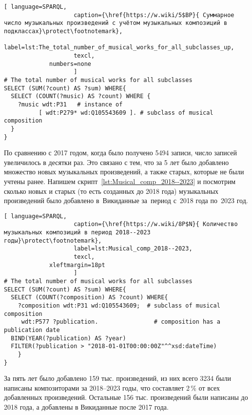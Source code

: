 \begin{lstlisting}[ language=SPARQL,
                    caption={\href{https://w.wiki/5$BP}{ Суммарное число музыкальных произведений с учётом музыкальных композиций в подклассах}\protect\footnotemark},
                    label=lst:The_total_number_of_musical_works_for_all_subclasses_up,
                    texcl,
	         numbers=none
                    ]
# The total number of musical works for all subclasses 
SELECT (SUM(?count) AS ?sum) WHERE{
  SELECT (COUNT(?music) AS ?count) WHERE {
    ?music wdt:P31   # instance of
          [ wdt:P279* wd:Q105543609 ]. # subclass of musical composition
  }
}
\end{lstlisting}%

По сравнению с 2017 годом, когда было получено \num{5494} записи, число записей увеличилось в десятки раз. Это связано с тем, что за 5 лет было добавлено множество новых музыкальных произведений, а также старых, которые не были учтены ранее.
Напишем скрипт~\ref{lst:Musical_comp_2018--2023} и посмотрим сколько новых и старых (то есть созданных до 2018 года) музыкальных произведений было добавлено в~Викиданные за~период с~2018 года по~2023 год.

\begin{lstlisting}[ language=SPARQL,
                    caption={\href{https://w.wiki/8P$N}{ Количество музыкальных композиций в период 2018--2023 годы}\protect\footnotemark},
                    label=lst:Musical_comp_2018--2023,
                    texcl,
	         xleftmargin=18pt
                    ]
# The total number of musical works for all subclasses 
SELECT (SUM(?count) AS ?sum) WHERE{
  SELECT (COUNT(?composition) AS ?count) WHERE{
    ?composition wdt:P31 wd:Q105543609;  # subclass of musical composition
     wdt:P577 ?publication.                # composition has a publication date
  BIND(YEAR(?publication) AS ?year)
  FILTER(?publication > "2018-01-01T00:00:00Z"^^xsd:dateTime)
    }
}
\end{lstlisting}%

За пять лет было добавлено \num{159} тыс. произведений, из них всего \num{3234} были написаны композиторами за 2018--2023 годы, что составляет 2\,\% от всех добавленных произведений. Остальные \num{156} тыс. произведений были написаны до 2018 года, а добавлены в Викиданные после 2017 года.

